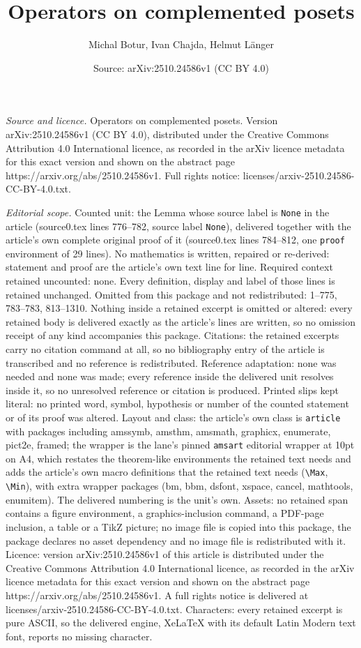 \documentclass[10pt,a4paper]{amsart}
\title[Operators on complemented posets]{Operators on complemented posets}
\author{Michal Botur, Ivan Chajda, Helmut L\"anger}
\date{Source: arXiv:2510.24586v1 (CC BY 4.0)}
\begin{document}
\maketitle

\noindent\emph{Source and licence.} Operators on complemented posets. Version arXiv:2510.24586v1 (CC BY 4.0), distributed under the Creative Commons Attribution 4.0 International licence, as recorded in the arXiv licence metadata for this exact version and shown on the abstract page https://arxiv.org/abs/2510.24586v1. Full rights notice: licenses/arxiv-2510.24586-CC-BY-4.0.txt.\par\smallskip

\noindent\textit{Editorial scope.} Counted unit: the Lemma whose source label is \texttt{None} in the article (source0.tex lines 776--782, source label \texttt{None}), delivered together with the article's own complete original proof of it (source0.tex lines 784--812, one \texttt{proof} environment of 29 lines). No mathematics is written, repaired or re-derived: statement and proof are the article's own text line for line. Required context retained uncounted: none. Every definition, display and label of those lines is retained unchanged. Omitted from this package and not redistributed: 1--775, 783--783, 813--1310. Nothing inside a retained excerpt is omitted or altered: every retained body is delivered exactly as the article's lines are written, so no omission receipt of any kind accompanies this package. Citations: the retained excerpts carry no citation command at all, so no bibliography entry of the article is transcribed and no reference is redistributed. Reference adaptation: none was needed and none was made; every reference inside the delivered unit resolves inside it, so no unresolved reference or citation is produced. Printed slips kept literal: no printed word, symbol, hypothesis or number of the counted statement or of its proof was altered. Layout and class: the article's own class is \texttt{article} with packages including amssymb, amsthm, amsmath, graphicx, enumerate, pict2e, framed; the wrapper is the lane's pinned \texttt{amsart} editorial wrapper at 10pt on A4, which restates the theorem-like environments the retained text needs and adds the article's own macro definitions that the retained text needs (\texttt{\textbackslash Max}, \texttt{\textbackslash Min}), with extra wrapper packages (bm, bbm, dsfont, xspace, cancel, mathtools, enumitem). The delivered numbering is the unit's own. Assets: no retained span contains a figure environment, a graphics-inclusion command, a PDF-page inclusion, a table or a TikZ picture; no image file is copied into this package, the package declares no asset dependency and no image file is redistributed with it. Licence: version arXiv:2510.24586v1 of this article is distributed under the Creative Commons Attribution 4.0 International licence, as recorded in the arXiv licence metadata for this exact version and shown on the abstract page https://arxiv.org/abs/2510.24586v1. A full rights notice is delivered at licenses/arxiv-2510.24586-CC-BY-4.0.txt. Characters: every retained excerpt is pure ASCII, so the delivered engine, XeLaTeX with its default Latin Modern text font, reports no missing character.
\end{document}
